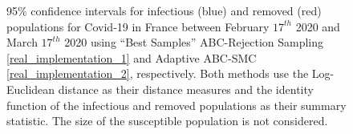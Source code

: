 \documentclass[11pt,a4paper]{article}
\theoremstyle{break}
\begin{document}
  \begin{figure}[H]
    \centering
    \caption{95\% confidence intervals for infectious (blue) and removed (red) populations for Covid-19 in France between February $17^{th}$ 2020 and March $17^{th}$ 2020 using ``Best Samples'' ABC-Rejection Sampling \ref{real_implementation_1} and Adaptive ABC-SMC \ref{real_implementation_2}, respectively. Both methods use the Log-Euclidean distance as their distance measures and the identity function of the infectious and removed populations as their summary statistic. The size of the susceptible population is not considered.}
    \label{fig_france_identity_ci}
  \end{figure}
\end{document}
